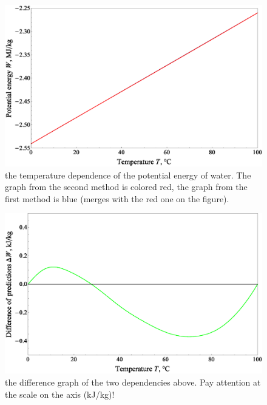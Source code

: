 \begin{figure}[!h]
\begin{center}
\includegraphics[scale=0.65]{1/fig13eng.eps}
\end{center}
\caption{the temperature dependence of the potential energy of water. The graph from the second method is colored red, the graph from the first method is blue (merges with the red one on the figure).}\label{energy}
\end{figure}

\begin{figure}[!h]
\begin{center}
\includegraphics[scale=0.65]{1/fig14eng.eps}
\end{center}
\caption{the difference graph of the two dependencies above. Pay attention at the scale on the axis (kJ/kg)!}\label{difenergy}
\end{figure} 